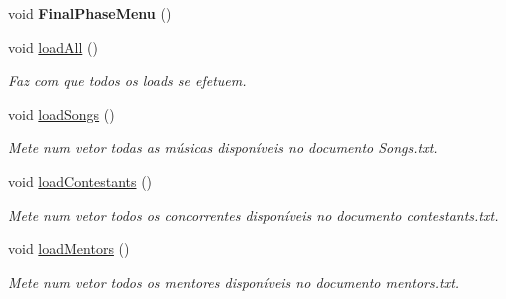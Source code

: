 \begin{DoxyCompactItemize}
\hypertarget{class_the_voice_ac617cb65eb101a0648eb2611fbad2d7b}{}\label{class_the_voice_ac617cb65eb101a0648eb2611fbad2d7b} 
void {\bfseries Final\+Phase\+Menu} ()
\item 
\hypertarget{class_the_voice_a983dc00939a199ff6ce1499a96ddf5e0}{}\label{class_the_voice_a983dc00939a199ff6ce1499a96ddf5e0} 
void \hyperlink{class_the_voice_a983dc00939a199ff6ce1499a96ddf5e0}{load\+All} ()
\begin{DoxyCompactList}\small\item\em Faz com que todos os loads se efetuem. \end{DoxyCompactList}\item 
\hypertarget{class_the_voice_ab78a07d9ee3ecf2104beb1ede52038cb}{}\label{class_the_voice_ab78a07d9ee3ecf2104beb1ede52038cb} 
void \hyperlink{class_the_voice_ab78a07d9ee3ecf2104beb1ede52038cb}{load\+Songs} ()
\begin{DoxyCompactList}\small\item\em Mete num vetor todas as músicas disponíveis no documento Songs.\+txt. \end{DoxyCompactList}\item 
\hypertarget{class_the_voice_aaa446085563031cf2d125618bf39f629}{}\label{class_the_voice_aaa446085563031cf2d125618bf39f629} 
void \hyperlink{class_the_voice_aaa446085563031cf2d125618bf39f629}{load\+Contestants} ()
\begin{DoxyCompactList}\small\item\em Mete num vetor todos os concorrentes disponíveis no documento contestants.\+txt. \end{DoxyCompactList}\item 
\hypertarget{class_the_voice_adf098f29f5238611930705b4894c9957}{}\label{class_the_voice_adf098f29f5238611930705b4894c9957} 
void \hyperlink{class_the_voice_adf098f29f5238611930705b4894c9957}{load\+Mentors} ()
\begin{DoxyCompactList}\small\item\em Mete num vetor todos os mentores disponíveis no documento mentors.\+txt. \end{DoxyCompactList}\end{DoxyCompactItemize}
